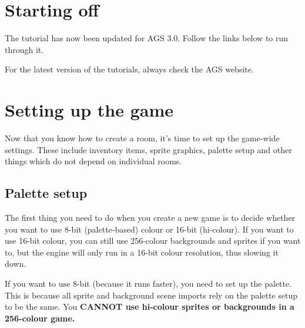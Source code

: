\section{Starting off}\label{StartingOff}%

The tutorial has now been updated for AGS 3.0. Follow the links below
to run through it.










For the latest version of the tutorials, always check the AGS website.


\section{Setting up the game}\label{Settingupthegame}%

Now that you know how to create a room, it's time to set up the game-wide
settings. These include inventory items, sprite graphics, palette setup
and other things which do not depend on individual rooms.

\subsection{Palette setup}\label{PalSetup}%

The first thing you need to do when you create a new game is to decide whether
you want to use 8-bit (palette-based) colour or 16-bit (hi-colour).
If you want to use 16-bit colour, you can still use 256-colour backgrounds and
sprites if you want to, but the engine will only run in a 16-bit colour
resolution, thus slowing it down.

If you want to use 8-bit (because it runs faster), you need to set up the
palette. This is because all sprite and background scene imports rely on the
palette setup to be the same. You \bf{CANNOT} use hi-colour sprites or backgrounds
in a 256-colour game.


